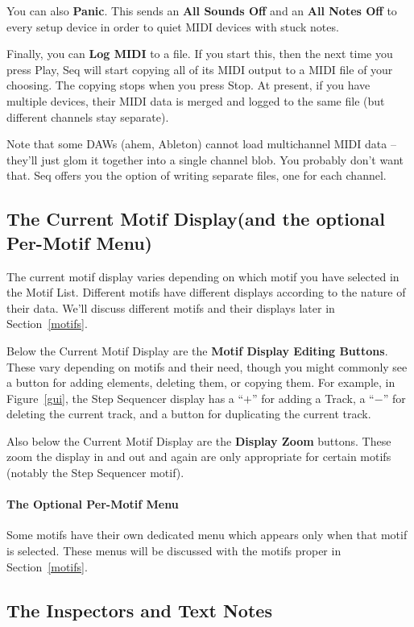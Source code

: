 \documentclass[twoside,10pt]{article}
\begin{document}
You can also {\bf Panic}.  This sends an {\bf All Sounds Off} and an {\bf All Notes Off} to every setup device in order to quiet MIDI devices with stuck notes.

Finally, you can {\bf Log MIDI} to a file.  If you start this, then the next time you press Play, Seq will start copying all of its MIDI output to a MIDI file of your choosing.  The copying stops when you press Stop.  At present, if you have multiple devices, their MIDI data is merged and logged to the same file (but different channels stay separate).  

Note that some DAWs (ahem, Ableton) cannot load multichannel MIDI data -- they'll just glom it together into a single channel blob.  You probably don't want that.  Seq offers you the option of writing separate files, one for each channel.

\subsection{The Current Motif Display\quad (and the optional Per-Motif Menu)}

The current motif display varies depending on which motif you have selected in the Motif List.  Different motifs have different displays according to the nature of their data.  We'll discuss different motifs and their displays later in Section~\ref{motifs}.  

 Below the Current Motif Display are the {\bf Motif Display Editing Buttons}.  These vary depending on motifs and their need, though you might commonly see a button for adding elements, deleting them, or copying them.  For example, in Figure~\ref{gui}, the Step Sequencer display has a ``\(+\)'' for adding a Track, a ``\(-\)'' for deleting the current track, and a button for duplicating the current track.

Also below the Current Motif Display are the {\bf Display Zoom} buttons.  These zoom the display in and out and again are only appropriate for certain motifs (notably the Step Sequencer motif).

\paragraph{The Optional Per-Motif Menu}  Some motifs have their own dedicated menu which appears only when that motif is selected.  These menus will be discussed with the motifs proper in Section~\ref{motifs}.


\subsection{The Inspectors and Text Notes}
\end{document}
